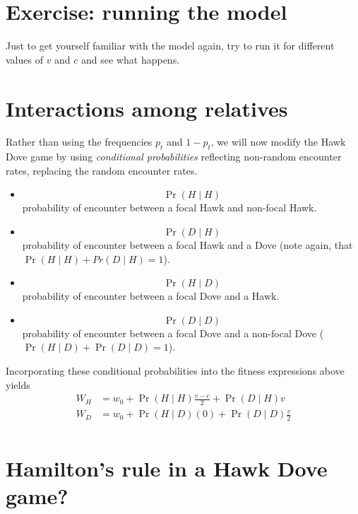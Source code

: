 \documentclass[
]{book}
\providecommand{\tightlist}{%
  \setlength{\itemsep}{0pt}\setlength{\parskip}{0pt}}
\begin{document}
\hypertarget{exercise-running-the-model}{%
\section{Exercise: running the model}\label{exercise-running-the-model}}

Just to get yourself familiar with the model again, try to run it for different values of \(v\) and \(c\) and see what happens.

\hypertarget{interactions-among-relatives}{%
\section{Interactions among relatives}\label{interactions-among-relatives}}

Rather than using the frequencies \(p_{t}\) and \(1-p_{t}\), we will now modify the Hawk Dove game by using \emph{conditional probabilities} reflecting non-random encounter rates, replacing the random encounter rates.

\begin{itemize}
\tightlist
\item
  \[ \Pr(H \mid H)\] probability of encounter between a focal Hawk and non-focal Hawk.
\item
  \[ \Pr(D \mid H)\] probability of encounter between a focal Hawk and a Dove (note again, that \(\Pr(H \mid H) + Pr(D \mid H) = 1\)).
\item
  \[ \Pr(H \mid D)\] probability of encounter between a focal Dove and a Hawk.
\item
  \[ \Pr(D \mid D)\] probability of encounter between a focal Dove and a non-focal Dove (\(\Pr(H \mid D) + \Pr(D \mid D) = 1\)).
\end{itemize}

Incorporating these conditional probabilities into the fitness expressions above yields
\begin{align}
W_{H} &= w_{0} + \Pr(H\mid H) \frac{v-c}{2} +  \Pr (D \mid H ) v \label{eq:wH} \\
W_{D} &= w_{0} + \Pr (H \mid D) (0) + \Pr ( D \mid D )  \frac{v}{2} \label{eq:wD}\\
\end{align}

\hypertarget{hamiltons-rule-in-a-hawk-dove-game}{%
\section{Hamilton's rule in a Hawk Dove game?}\label{hamiltons-rule-in-a-hawk-dove-game}}
\end{document}
